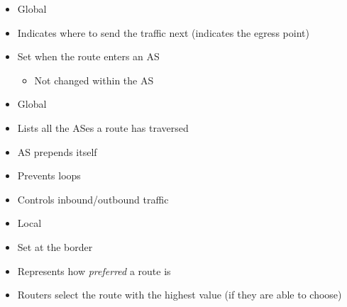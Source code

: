 \begin{itemize}
\begin{itemize}
\begin{itemize}
\begin{itemize}
\begin{itemize}
\begin{itemize}
\begin{itemize}
                                                \end{itemize}
                                                \begin{itemize}
                                                    \item Global
                                                    \item Indicates where to send the traffic next (indicates the egress point)
                                                    \item Set when the route enters an AS
                                                        \begin{itemize}
                                                            \item Not changed within the AS
                                                        \end{itemize}
                                                \end{itemize}
                                                \begin{itemize}
                                                    \item Global
                                                    \item Lists all the ASes a route has traversed
                                                    \item AS prepends itself
                                                    \item Prevents loops
                                                    \item Controls inbound/outbound traffic
                                                \end{itemize}
                                                \begin{itemize}
                                                    \item Local
                                                    \item Set at the border
                                                    \item Represents how \textit{preferred} a route is
                                                    \item Routers select the route with the highest value (if they are able to choose)

\end{itemize}
\end{itemize}
\end{itemize}
\end{itemize}
\end{itemize}
\end{itemize}
\end{itemize}
